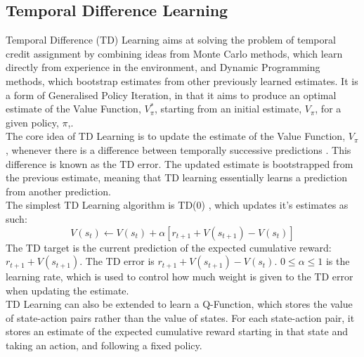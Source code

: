 \subsection{Temporal Difference Learning}
Temporal Difference (TD) Learning \citep{10.5555/911176, 5392560, 5391906} aims at solving the problem of temporal credit assignment by combining ideas from Monte Carlo methods, which learn directly from experience in the environment, and Dynamic Programming methods, which bootstrap estimates from other previously learned estimates. It is a form of Generalised Policy Iteration, in that it aims to produce an optimal estimate of the Value Function, $V_\pi^*$, starting from an initial estimate, $V_\pi$, for a given policy, $\pi$,\citep{Sutton1998}.
\\The core idea of TD Learning is to update the estimate of the Value Function, $V_\pi$, whenever there is a difference between temporally successive predictions \cite{Sutton:1988}. This difference is known as the TD error. The updated estimate is bootstrapped from the previous estimate, meaning that TD learning essentially learns a prediction from another prediction.
\\The simplest TD Learning algorithm is TD(0) \citep{Sutton:1988}, which updates it's estimates as such:
\begin{equation}
\label{eqn:td0update}
V(s_t) \leftarrow V(s_t) + \alpha[r_{t+1} + V(s_{t+1}) - V(s_t)]
\end{equation}
The TD target is the current prediction of the expected cumulative reward: $r_{t+1} + V(s_{t+1})$. The TD error is $r_{t+1} + V(s_{t+1}) - V(s_t)$.
$0 \le \alpha \le 1$ is the learning rate, which is used to control how much weight is given to the TD error when updating the estimate. 
\\TD Learning can also be extended to learn a Q-Function, which stores the value of state-action pairs rather than the value of states. For each state-action pair, it stores an estimate of the expected cumulative reward starting in that state and taking an action, and following a fixed policy.


